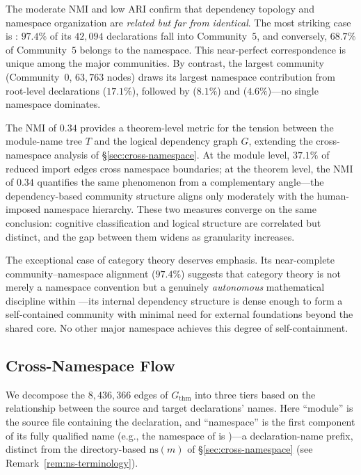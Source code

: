 The moderate NMI and low ARI confirm that dependency topology and namespace organization are \emph{related but far from identical}. The most striking case is : $97.4\%$ of its $42{,}094$ declarations fall into Community~$5$, and conversely, $68.7\%$ of Community~$5$ belongs to the  namespace. This near-perfect correspondence is unique among the major communities. By contrast, the largest community (Community~$0$, $63{,}763$ nodes) draws its largest namespace contribution from root-level declarations ($17.1\%$), followed by  ($8.1\%$) and  ($4.6\%$)---no single namespace dominates.

\begin{remark}
\label{rem:nmi-tension}
The NMI of $0.34$ provides a theorem-level metric for the tension between the module-name tree $T$ and the logical dependency graph $G$, extending the cross-namespace analysis of \S\ref{sec:cross-namespace}. At the module level, $37.1\%$ of reduced import edges cross namespace boundaries; at the theorem level, the NMI of $0.34$ quantifies the same phenomenon from a complementary angle---the dependency-based community structure aligns only moderately with the human-imposed namespace hierarchy. These two measures converge on the same conclusion: cognitive classification and logical structure are correlated but distinct, and the gap between them widens as granularity increases.

The exceptional case of category theory deserves emphasis. Its near-complete community--namespace alignment ($97.4\%$) suggests that category theory is not merely a namespace convention but a genuinely \emph{autonomous} mathematical discipline within ---its internal dependency structure is dense enough to form a self-contained community with minimal need for external foundations beyond the shared core. No other major namespace achieves this degree of self-containment.
\end{remark}

\subsection{Cross-Namespace Flow}
\label{sec:thm-cross-namespace}

We decompose the $8{,}436{,}366$ edges of $G_{\mathrm{thm}}$ into three tiers based on the relationship between the source and target declarations' names. Here ``module'' is the source file containing the declaration, and ``namespace'' is the first component of its fully qualified name (e.g., the namespace of  is )---a declaration-name prefix, distinct from the directory-based $\mathrm{ns}(m)$ of \S\ref{sec:cross-namespace} (see Remark~\ref{rem:ns-terminology}).

